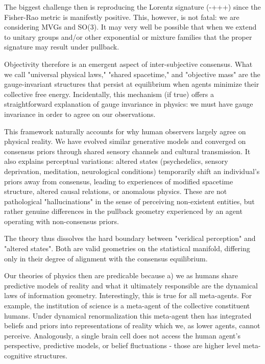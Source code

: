 \documentclass[11pt]{article}
\begin{document}
The biggest challenge then is reproducing the Lorentz signature (-+++) since the Fisher-Rao metric is manifestly positive.  This, however, is not fatal: we are considering MVGs and SO(3).  It may very well be possible that when we extend to unitary groups and/or other exponential or mixture families that the proper signature may result under pullback.



Objectivity therefore is an emergent aspect of inter-subjective consensus. What we call "universal physical laws," "shared spacetime," and "objective mass" are the gauge-invariant structures that persist at equilibrium when agents minimize their collective free energy.  Incidentally, this mechanism (if true) offers a straightforward explanation of gauge invariance in physics: we must have gauge invariance in order to agree on our observations.

This framework naturally accounts for why human observers largely agree 
on physical reality. We have evolved similar generative models and converged on consensus priors through shared sensory channels and cultural transmission. It also explains perceptual variations: altered states (psychedelics, sensory deprivation, meditation, neurological conditions) temporarily shift an individual's priors away from consensus, leading to experiences of modified spacetime structure, altered causal relations, or anomalous physics. These are not pathological "hallucinations" in the sense of perceiving non-existent entities, but rather genuine differences in the pullback geometry experienced by an agent operating with non-consensus priors.

The theory thus dissolves the hard boundary between "veridical perception" and "altered states". Both are valid geometries on the statistical manifold, differing only in their degree of alignment with the consensus equilibrium.

Our theories of physics then are predicable because a) we as humans share predictive models of reality and what it ultimately responsible are the dynamical laws of information geometry.  Interestingly, this is true for all meta-agents.  For example, the institution of science is a meta-agent of the collective constituent humans.  Under dynamical renormalization this meta-agent then has integrated beliefs and priors into representations of reality which we, as lower agents, cannot perceive. Analogously, a single brain cell does not access the human agent's perspective, predictive models, or belief fluctuations - those are higher level meta-cognitive structures.
\end{document}
